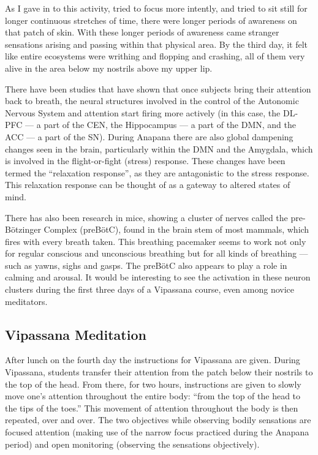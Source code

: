 \documentclass[a4paper, amsfonts, amssymb, amsmath, reprint, showkeys, nofootinbib, twoside]{revtex4-1}
\begin{document}
As I gave in to this activity, tried to focus more intently, and tried to sit still for
longer continuous stretches of time, there were longer periods of awareness on that
patch of skin. With these longer periods of awareness came
stranger sensations arising and passing within that physical area. By the third day,
it felt like entire ecosystems were writhing and flopping and crashing, all of them
very alive in the area below my nostrils above my upper lip.


There have been studies that have shown that once subjects bring their
attention back to breath, the neural structures involved in the control
of the Autonomic Nervous System and attention start firing more actively
(in this case, the DL-PFC --- a part of the CEN, the Hippocampus --- a part of the
DMN, and the ACC --- a part of the SN). During Anapana there are also global
dampening changes seen in the brain, particularly within the DMN and the Amygdala, which is involved in
the flight-or-fight (stress) response. These changes have been
termed the ``relaxation response'', as they are antagonistic to the stress
response. This relaxation response can be thought of as a gateway to altered states
of mind. \cite{relaxationresponse}


There has also been research in mice, showing a cluster of nerves called the
pre-Bötzinger Complex (preBötC), found in the brain stem of most mammals, which fires
with every breath taken. This breathing pacemaker seems to work not only for regular
conscious and unconscious breathing but for all kinds of breathing --- such as yawns,
sighs and gasps. The preBötC also appears to play a role in calming and
arousal. \cite{prebotcgeneration} It would be interesting to see the activation in
these neuron clusters during the first three days of a Vipassana course, even among
novice meditators.

\subsection{Vipassana Meditation}

After lunch on the fourth day the instructions for Vipassana are given. During
Vipassana, students transfer their attention from the patch below their nostrils to the top
of the head. From there, for two hours, instructions are given to slowly move
one's attention throughout the entire body: ``from the top of the head to the tips of
the toes.'' This movement of attention throughout the body is then repeated, over and
over. The two objectives while observing bodily sensations are focused attention (making
use of the narrow focus practiced during the Anapana period) and open monitoring
(observing the sensations objectively).
\end{document}
